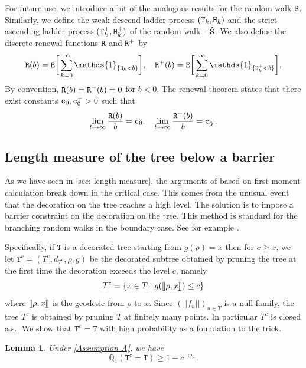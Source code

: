 \documentclass[12pt]{article}
\def\llbracket{[\hspace{-.10em} [ }
\def\rrbracket{ ] \hspace{-.10em}]}
\numberwithin{equation}{section}
\theoremstyle{plain}
\newtheorem{lem}[thm]{Lemma}
\theoremstyle{definition}
\begin{document}
For future use, we introduce a bit of the analogous results for the random walk ${\tt S}$. Similarly, we define the weak descend ladder process $({\tt T}_k, {\tt H}_k)$ and the strict ascending ladder process $({\tt T}^+_k, {\tt H}^+_k)$ of the random walk $-{\hat{\tt S}}$. We also define the discrete renewal functions ${\tt R}$ and ${\tt R}^+$ by
\begin{equation}\label{eq: def R rw}
{\tt R}(b) = {\tt E}\bigg[\sum^{\infty}_{k=0} \mathds{1}_{\{{\tt H}_k < b\}}\bigg], \quad {\tt R}^+(b) = {\tt E}\bigg[\sum^{\infty}_{k=0} \mathds{1}_{\{{\tt H}^+_k < b\}} \bigg].
\end{equation}
\noindent By convention, ${\tt R}(b) = {\tt R}^-(b) = 0$ for $b<0$. The renewal theorem states that there exist constants ${\tt c}_0, {\tt c}_0^- > 0$ such that
\begin{equation}\label{eq: def tt c_0}
\lim_{b\to\infty} \frac{{\tt R}(b)}{b} = {\tt c}_0, \quad \lim_{b\to\infty} \frac{{\tt R}^-(b)}{b} = {\tt c}^-_0.
\end{equation}


\subsection{Length measure of the tree below a barrier}\label{sec: tree below barrier}
As we have seen in \cref{sec: length measure}, the arguments of \cite[Section 2.3]{BertoinJean2024SMta} based on first moment calculation break down in the critical case. This comes from the unusual event that the decoration on the tree reaches a high level. The solution is to impose a barrier constraint on the decoration on the tree. This method is standard for the branching random walks in the boundary case. See for example \cite{ChenXinxin2015Anas, AidekonElie2024Bodt}.

Specifically, if $\mathtt{T}$ is a decorated tree starting from $g(\rho)=x$ then for $c\geq x$, we let $\mathtt{T}^c = (T^c, d_{T^c}, \rho, g)$ be the decorated subtree obtained by pruning the tree at the first time the decoration exceeds the level $c$, namely $$T^{c} = \{x\in T: g(\llbracket \rho, x \rrbracket)\leq c\}$$ where $\llbracket\rho,x\rrbracket$ is the geodesic from $\rho$ to $x$. Since $(||f_u||)_{u\in T}$ is a null family, the tree $T^c$ is obtained by pruning $T$ at finitely many points. In particular $T^c$ is closed a.s.. We show that $\mathtt{T}^c = \mathtt{T}$ with high probability as a foundation to the trick.

\begin{lem}\label{lem: Truncation}
Under \cref{Assumption A}, we have
\begin{equation}\label{eq: Truncation}
\mathbb{Q}_1(\mathtt{T}^c = \mathtt{T}) \geq 1 - c^{-\omega_-}.
\end{equation}
\end{lem}
\end{document}
